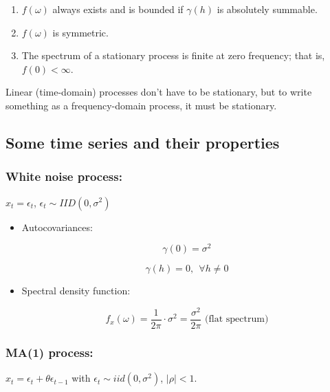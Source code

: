 \documentclass{article}
\begin{document}
\begin{enumerate}[(1)]

\item \(f(\omega)\) always exists and is bounded if \(\gamma(h)\) is absolutely summable.

\item \(f(\omega)\) is symmetric.

\item The spectrum of a stationary process is finite at zero frequency; that is, \(f(0) < \infty\).

\end{enumerate}

Linear (time-domain) processes don't have to be stationary, but to write something as a frequency-domain process, it must be stationary.

\subsection{Some time series and their properties}


\subsubsection{White noise process:}  \(x_t = \epsilon_t\), \(\epsilon_t \sim IID(0, \sigma^2)\)

\begin{itemize}

\item Autocovariances: 

\[
\gamma(0) = \sigma^2
\]

\[
\gamma(h) =0, \ \ \forall h \neq 0
\]

\item Spectral density function:

\[
f_x(\omega) = \frac{1}{2\pi} \cdot \sigma^2 = \frac{\sigma^2}{2 \pi} \text{ (flat spectrum)}
\]

\end{itemize}


\subsubsection{MA(1) process:} \(x_t = \epsilon_t + \theta \epsilon_{t-1}\) with \(\epsilon_t \sim iid(0, \sigma^2)\), \(|\rho| < 1\). 
\end{document}
